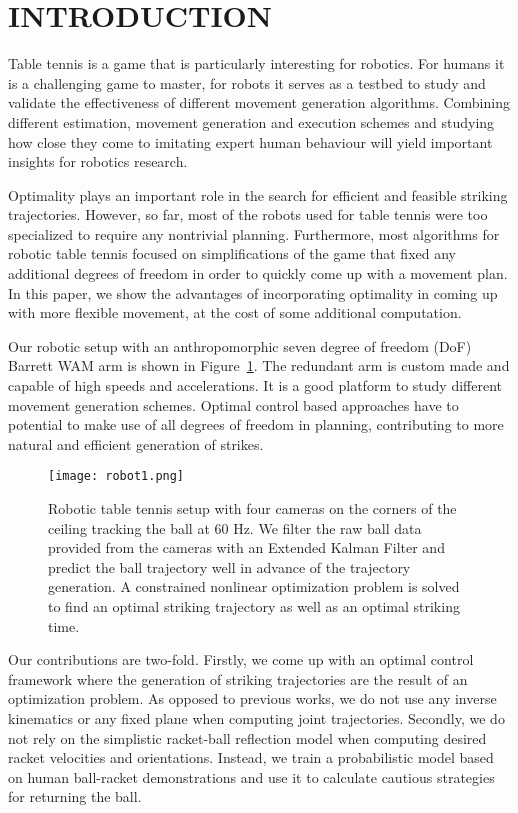 \section{INTRODUCTION}

Table tennis is a game that is particularly interesting for robotics. For humans it is a challenging game to master, for robots it serves as a testbed to study and validate the effectiveness of different movement generation algorithms. Combining different estimation, movement generation and execution schemes and studying how close they come to imitating expert human behaviour will yield important insights for robotics research.

Optimality plays an important role in the search for efficient and feasible striking trajectories. However, so far, most of the robots used for table tennis were too specialized to require any nontrivial planning. Furthermore, most algorithms for robotic table tennis focused on simplifications of the game that fixed any additional degrees of freedom in order to quickly come up with a movement plan. In this paper, we show the advantages of incorporating optimality in coming up with more flexible movement, at the cost of some additional computation. 

Our robotic setup with an anthropomorphic seven degree of freedom (DoF) Barrett WAM arm is shown in Figure~\ref{robot}. The redundant arm is custom made and capable of high speeds and accelerations. It is a good platform to study different movement generation schemes. Optimal control based approaches have to potential to make use of all degrees of freedom in planning, contributing to more natural and efficient generation of strikes.

\begin{figure}[t!]
\center
\texttt{[image: robot1.png]}			
\caption{Robotic table tennis setup with four cameras on the corners of the ceiling tracking the ball at 60 Hz. We filter the raw ball data provided from the cameras with an Extended Kalman Filter and predict the ball trajectory well in advance of the trajectory generation. A constrained nonlinear optimization problem is solved to find an optimal striking trajectory as well as an optimal striking time.}
\label{robot}
\end{figure}

Our contributions are two-fold. Firstly, we come up with an optimal control framework where the generation of striking trajectories are the result of an optimization problem. As opposed to previous works, we do not use any inverse kinematics or any fixed plane when computing joint trajectories. Secondly, we do not rely on the simplistic racket-ball reflection model when computing desired racket velocities and orientations. Instead, we train a probabilistic model based on human ball-racket demonstrations and use it to calculate cautious strategies for returning the ball.


